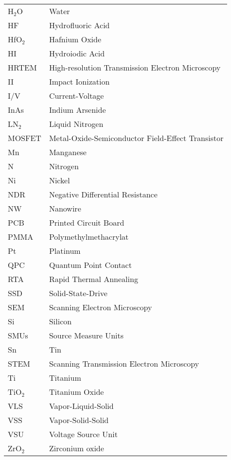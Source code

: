\newpage

\begin{tabular}{l l}

H$_2$O & Water \\
HF & Hydrofluoric Acid \\
HfO$_2$ & Hafnium Oxide \\
HI & Hydroiodic Acid \\
HRTEM & High-resolution Transmission Electron Microscopy \\
II & Impact Ionization \\
I/V & Current-Voltage \\
InAs & Indium Arsenide \\
LN$_2$ & Liquid Nitrogen \\
MOSFET & Metal-Oxide-Semiconductor Field-Effect Transistor \\
Mn & Manganese \\
N & Nitrogen \\
Ni & Nickel \\
NDR & Negative Differential Resistance \\ 
NW & Nanowire \\
PCB & Printed Circuit Board \\
PMMA & Polymethylmethacrylat \\
Pt & Platinum \\
QPC & Quantum Point Contact \\
RTA & Rapid Thermal Annealing \\
SSD & Solid-State-Drive \\
SEM & Scanning Electron Microscopy \\
Si & Silicon\\
SMUs & Source Measure Units \\
Sn & Tin \\
STEM & Scanning Transmission Electron Microscopy \\
Ti & Titanium \\
TiO$_2$ & Titanium Oxide \\
VLS & Vapor-Liquid-Solid \\
VSS & Vapor-Solid-Solid \\
VSU & Voltage Source Unit \\
ZrO$_2$ & Zirconium oxide \\

\end{tabular}
